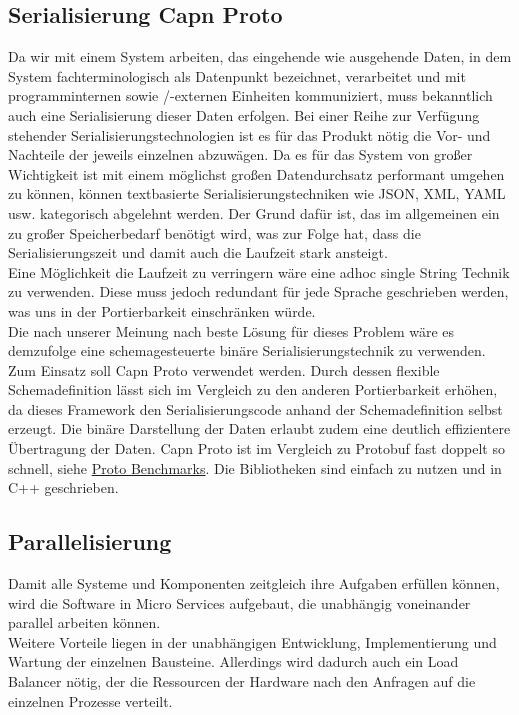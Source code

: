 \subsection{Serialisierung Capn Proto}
Da wir mit einem System arbeiten, das eingehende wie ausgehende Daten, in dem System fachterminologisch als Datenpunkt bezeichnet, verarbeitet und mit programminternen sowie /-externen Einheiten kommuniziert, muss bekanntlich auch eine Serialisierung dieser Daten erfolgen.  Bei einer Reihe zur Verfügung stehender Serialisierungstechnologien ist es für das Produkt nötig die Vor- und Nachteile der jeweils einzelnen abzuwägen. Da es für das System von großer Wichtigkeit ist mit einem möglichst großen Datendurchsatz performant umgehen zu können, können textbasierte Serialisierungstechniken wie JSON, XML, YAML usw. kategorisch abgelehnt werden. Der Grund dafür ist, das im allgemeinen ein zu großer Speicherbedarf benötigt wird, was zur Folge hat, dass die Serialisierungszeit und damit auch die Laufzeit stark ansteigt.\\ 
Eine Möglichkeit die Laufzeit zu verringern wäre eine adhoc single String Technik zu verwenden. Diese muss jedoch redundant für jede Sprache geschrieben werden, was uns in der Portierbarkeit einschränken würde.\\
Die nach unserer Meinung nach beste Lösung für dieses Problem wäre es demzufolge eine schemagesteuerte binäre Serialisierungstechnik zu verwenden. Zum Einsatz soll Capn Proto verwendet werden. Durch dessen flexible Schemadefinition lässt sich im Vergleich zu den anderen Portierbarkeit erhöhen, da dieses Framework den Serialisierungscode anhand der Schemadefinition selbst erzeugt. Die binäre Darstellung der Daten erlaubt zudem eine deutlich effizientere Übertragung der Daten. Capn Proto ist im Vergleich zu Protobuf fast doppelt so schnell, siehe \href{https://github.com/ChrisMacNaughton/proto_benchmarks}{Proto Benchmarks}. Die Bibliotheken sind einfach zu nutzen und in C++ geschrieben.
\subsection{Parallelisierung}
Damit alle Systeme und Komponenten zeitgleich ihre Aufgaben erfüllen können, wird die Software in Micro Services aufgebaut, die unabhängig voneinander parallel arbeiten können.\\
Weitere Vorteile liegen in der unabhängigen Entwicklung, Implementierung und Wartung der einzelnen Bausteine. Allerdings wird dadurch auch ein Load Balancer nötig, der die Ressourcen der Hardware nach den Anfragen auf die einzelnen Prozesse verteilt. 
